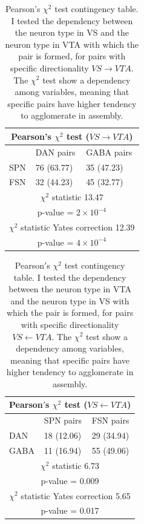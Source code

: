\begin{table}[H]
\begin{tabular}{ |p{3cm}|p{3cm}|p{3cm}| }
 \hline
 \multicolumn{3}{|c|}{Pearson's $\chi^2$ test ($VS \rightarrow VTA$)} \\
 \hline
 & DAN pairs & GABA pairs\\
 \hline
 SPN & 76 (63.77) & 35 (47.23) \\
 \hline
 FSN & 32 (44.23) & 45 (32.77)\\
 \hline
 \multicolumn{3}{|c|}{$\chi^2$ statistic  13.47}\\
 \multicolumn{3}{|c|}{p-value = $2\times10^{-4}$}\\
 \hline
 \multicolumn{3}{|c|}{$\chi^2$ statistic Yates correction 12.39}\\
 \multicolumn{3}{|c|}{p-value = $4\times10^{-4}$}\\
 \hline
\end{tabular}
\caption{Pearson's $\chi^{2}$ test contingency table. I tested the dependency between the neuron type in VS and the neuron type in VTA with which the pair is formed, for pairs with specific directionality $VS \rightarrow VTA$. The $\chi^2$ test show a dependency among variables, meaning that specific pairs have higher tendency to agglomerate in assembly.}
\label{tab:chisquare_vsvta}
\end{table}
\begin{table}[H]
\begin{tabular}{ |p{3cm}|p{3cm}|p{3cm}| }
 \hline
 \multicolumn{3}{|c|}{Pearson$'$s $\chi^2$ test ($VS \leftarrow VTA$)} \\
 \hline
 & SPN pairs & FSN pairs\\
 \hline
 DAN & 18 (12.06) & 29 (34.94) \\
 \hline
 GABA & 11 (16.94) & 55 (49.06)\\
 \hline
 \multicolumn{3}{|c|}{$\chi^2$ statistic  6.73}\\
 \multicolumn{3}{|c|}{p-value = 0.009}\\
 \hline
 \multicolumn{3}{|c|}{$\chi^2$ statistic Yates correction 5.65}\\
 \multicolumn{3}{|c|}{p-value = 0.017}\\
 \hline
\end{tabular}
\caption{Pearson$'$s $\chi^{2}$ test contingency table. I tested the dependency between the neuron type in VTA and the neuron type in VS with which the pair is formed, for pairs with specific directionality $VS \leftarrow VTA$. The $\chi^2$ test show a dependency among variables, meaning that specific pairs have higher tendency to agglomerate in assembly.}
\label{tab:chisquare_vtavs}
\end{table}
